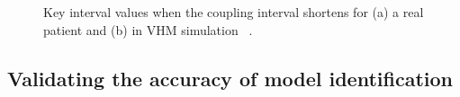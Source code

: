 \documentclass[openany]{now} %
\begin{document}
\begin{figure}[!t]
\centering
\label{fig:Case_1}
\caption{\small Key interval values when the coupling interval shortens for (a) a real patient and (b) in VHM simulation ~\cite{vhm_ecrts10}.}
\end{figure} 

\subsection{Validating the accuracy of model identification}

\end{document}
